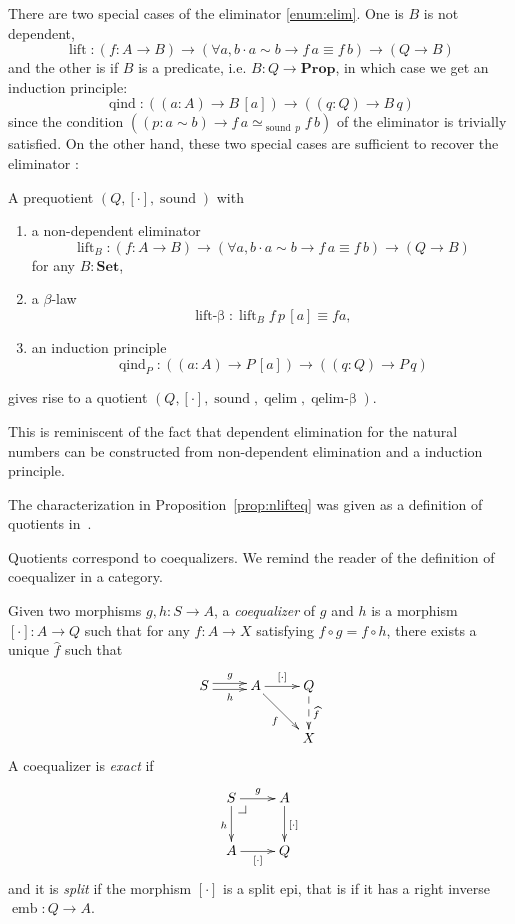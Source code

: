 \documentclass{llncs}
\makeatletter
\newcommand{\prop}{\mathbf{Prop}}
\newcommand{\bocks}[1]{[#1]}
\newcommand{\lift}[1]{\widehat{#1}}
\DeclareMathOperator*{\sound}{\mathrm{sound}}
\DeclareMathOperator*{\qelimok}{\mathrm{qelim}-\beta}
\DeclareMathOperator{\qind}{\mathrm{qind}}
\newcommand{\Set}{\mathbf{Set}}
\DeclareMathOperator*{\emb}{\mathrm{emb}}
\newcommand{\pullbackcorner}[1][dr]{\save*!/#1-1.2pc/#1:(-1,1)@^{|-}\restore}
\DeclareMathOperator{\elim}{\mathrm{qelim}}
\DeclareMathOperator{\nlift}{\mathrm{lift}}
\DeclareMathOperator{\nliftbeta}{\mathrm{lift}-\beta}
\makeatother
\begin{document}
There are two special cases of the eliminator \ref{enum:elim}. One is $B$ is not dependent,
 \[\nlift\colon (f\colon A \to B) \to (\forall a,b\cdot a\sim b \to f\,a \equiv f\,b) \to (Q \to B)\]
and the other is if $B$ is a predicate, i.e. $B : Q\to \prop$, in which case we get an induction principle:
\[\qind \colon((a\colon A)\to B \,\bocks a)\to ((q\colon Q)\to B\,q)\]
since the condition $((p:a\sim b) \to f\,a \simeq_{\sound\,p}f\,b) $  of  the eliminator is trivially satisfied.
On the other hand, these two special cases are sufficient to recover the eliminator :      


\begin{proposition}\label{prop:nlifteq}
A prequotient $(Q,\bocks\cdot,\sound)$ with 

\begin{enumerate}
\item a non-dependent eliminator $$\nlift_B\colon (f\colon A \to B) \to (\forall a,b\cdot a\sim b \to f\,a \equiv f\,b) \to (Q \to B)$$ for any $B\colon\Set$,
\item a $\beta$-law $$\nliftbeta : \nlift_B f \,p\,\bocks a\equiv f a,$$
\item an induction principle $$\qind_P\colon ((a\colon A)\to P \,\bocks a)\to ((q\colon Q)\to P\,q)$$
\end{enumerate} 
gives rise to a quotient $(Q,\bocks\cdot,\sound,\elim,\qelimok)$.
\end{proposition}
This is reminiscent of the fact that dependent elimination for the natural numbers can be constructed from non-dependent elimination and a induction principle.

The characterization in Proposition~\ref{prop:nlifteq} was given as a definition of quotients in~\cite{hofmann:thesis}.


Quotients correspond to coequalizers. We remind the reader of the definition of coequalizer in a category. 

\begin{definition}
Given two morphisms $g,h : S\to A$, a \emph{coequalizer} of $g$ and $h$ is a morphism $\bocks\cdot:A\to Q$ such that for any $f:A\to X$ satisfying $f \circ g = f \circ h$, there exists a unique $\lift f$ such that  
\[\xymatrix{
S\ar@<0.5ex>[r]^g\ar@<-0.5ex>[r]_h& A\ar[r]^{\bocks\cdot}\ar[dr]_{f} & Q\ar@{-->}[d]^{\lift f}\\
&&X
}\]
A coequalizer is \emph{exact} if 
\[\xymatrix{
S\pullbackcorner\ar[r]^g\ar[d]_h & A\ar[d]^{\bocks\cdot} \\
A\ar[r]_{\bocks\cdot} & Q
}\]
and it is \emph{split} if the morphism $\bocks\cdot$ is a split epi, that is if it has a right inverse $\emb : Q \to A$.
\end{definition}
\end{document}
